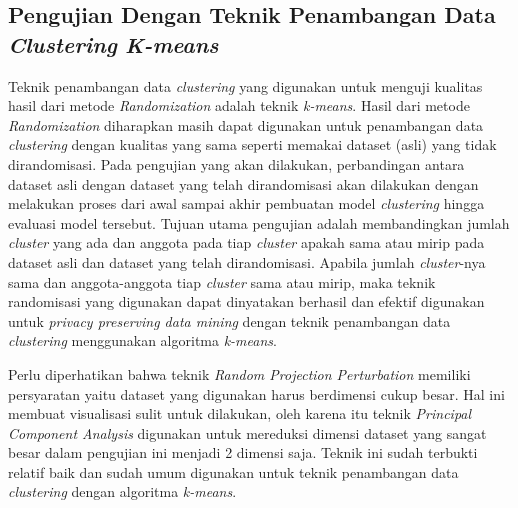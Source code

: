 \subsection{Pengujian Dengan Teknik Penambangan Data \textit{Clustering} \textit{K-means}}
\label{subsec:analisis-kmeans}

Teknik penambangan data \textit{clustering} yang digunakan untuk menguji kualitas hasil dari metode \textit{Randomization} adalah teknik \textit{k-means}. Hasil dari metode \textit{Randomization} diharapkan masih dapat digunakan untuk penambangan data \textit{clustering} dengan kualitas yang sama seperti memakai dataset (asli) yang tidak dirandomisasi. Pada pengujian yang akan dilakukan, perbandingan antara dataset asli dengan dataset yang telah dirandomisasi akan dilakukan dengan melakukan proses dari awal sampai akhir pembuatan model \textit{clustering} hingga evaluasi model tersebut. Tujuan utama pengujian adalah membandingkan jumlah \textit{cluster} yang ada dan anggota pada tiap \textit{cluster} apakah sama atau mirip pada dataset asli dan dataset yang telah dirandomisasi. Apabila jumlah \textit{cluster}-nya sama dan anggota-anggota tiap \textit{cluster} sama atau mirip, maka teknik randomisasi yang digunakan dapat dinyatakan berhasil dan efektif digunakan untuk \textit{privacy preserving data mining} dengan teknik penambangan data \textit{clustering} menggunakan algoritma \textit{k-means}.

Perlu diperhatikan bahwa teknik \textit{Random Projection Perturbation} memiliki persyaratan yaitu dataset yang digunakan harus berdimensi cukup besar. Hal ini membuat visualisasi sulit untuk dilakukan, oleh karena itu teknik \textit{Principal Component Analysis} digunakan untuk mereduksi dimensi dataset yang sangat besar dalam pengujian ini menjadi 2 dimensi saja. Teknik ini sudah terbukti relatif baik dan sudah umum digunakan untuk teknik penambangan data \textit{clustering} dengan algoritma \textit{k-means}.

